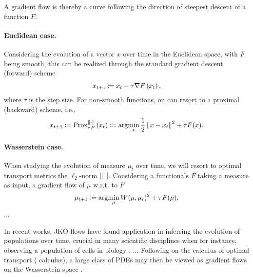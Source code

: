 
A gradient flow is thereby a curve following the direction of steepest descent of a function $F$.



\paragraph{Euclidean case.} Considering the evolution of a vector $x$ over time in the Euclidean space, with $F$ being smooth, this can be realized through the standard gradient descent (forward) scheme
\begin{equation*}
	x_{t+1} \coloneqq x_{t}-\tau \nabla F\left(x_{t}\right),
\end{equation*}
where $\tau$ is the step size. For non-smooth functions, on can resort to a proximal (backward) scheme, i.e.,
\begin{equation*}
	x_{t+1} \coloneqq \operatorname{Prox}_{\tau F}^{\|\cdot\|}\left(x_{t}\right) \coloneqq \arg\!\min_x \frac{1}{2}\left\| x-x_t\right\|^2+\tau F(x).
\end{equation*}

\paragraph{Wasserstein case.} When studying the evolution of measure $\mu_t$ over time, we will resort to optimal transport metrics the $\ell_2$-norm $\lVert\cdot\rVert$.
Considering a functionals $F$ taking a measure as input, a gradient flow of $\mu$ w.r.t. to $F$ 
\begin{equation}
	\mu_{t+1} \coloneqq \arg\!\min_\mu W(\mu, \mu_t)^2+\tau F(\mu).
\end{equation}
...

In recent works, \acrshort{JKO} flows have found application in inferring the evolution of populations over time, crucial in many scientific disciplines when for instance, observing a population of cells in biology \citep{bunne2022proximal, alvarez2021optimizing, mokrov2021large, benamou2016augmented}.
...
Following \citet{otto2001geometry} on the calculus of optimal transport (\citeauthor{otto2001geometry} calculus), a large class of PDEs may then be viewed as gradient flows on the Wasserstein space \citep{jordan1998variational}.


